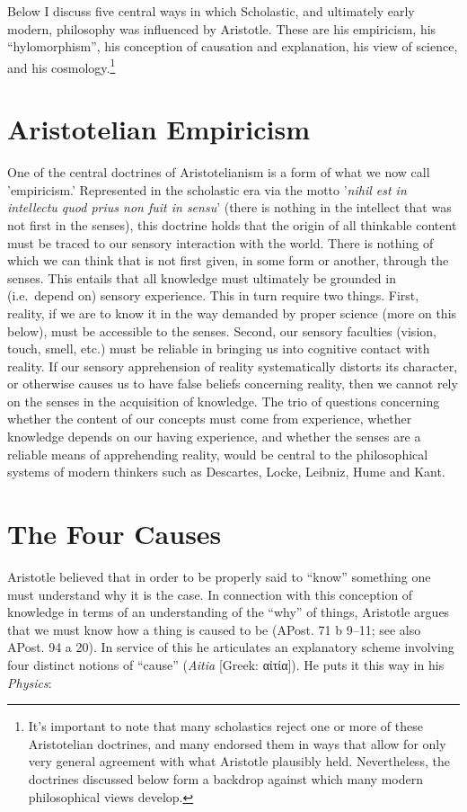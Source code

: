 \documentclass[12pt]{article}
\begin{document}
Below I discuss five central ways in which Scholastic, and ultimately early modern,
philosophy was influenced by Aristotle. These are his empiricism, his ``hylomorphism'',
his conception of causation and explanation, his view of science, and his
cosmology.\footnote{It's important to note that many scholastics reject one or more
of these Aristotelian doctrines, and many endorsed them in ways
that allow for only very general agreement with what Aristotle
plausibly held. Nevertheless, the doctrines discussed below form
a backdrop against which many modern philosophical views develop.}

\section{Aristotelian Empiricism}
\label{sec:org6a06f2b}
One of the central doctrines of Aristotelianism is a form of what we now call
'empiricism.' Represented in the scholastic era via the motto '\emph{nihil est in
intellectu quod prius non fuit in sensu}' (there is nothing in the intellect that was
not first in the senses), this doctrine holds that the origin of all thinkable
content must be traced to our sensory interaction with the world. There is nothing of
which we can think that is not first given, in some form or another, through the
senses. This entails that all knowledge must ultimately be grounded in (i.e. depend
on) sensory experience. This in turn require two things. First, reality, if we are to
know it in the way demanded by proper science (more on this below), must be
accessible to the senses. Second, our sensory faculties (vision, touch, smell, etc.)
must be reliable in bringing us into cognitive contact with reality. If our sensory
apprehension of reality systematically distorts its character, or otherwise causes us
to have false beliefs concerning reality, then we cannot rely on the senses in the
acquisition of knowledge. The trio of questions concerning whether the content of our
concepts must come from experience, whether knowledge depends on our having
experience, and whether the senses are a reliable means of apprehending reality,
would be central to the philosophical systems of modern thinkers such as Descartes,
Locke, Leibniz, Hume and Kant.

\section{The Four Causes}
\label{sec:orge4598d2}
Aristotle believed that in order to be properly said to ``know'' something one must
understand why it is the case. In connection with this conception of knowledge in
terms of an understanding of the ``why'' of things, Aristotle argues that we must know
how a thing is caused to be (APost. 71 b 9--11; see also APost. 94 a 20). In service
of this he articulates an explanatory scheme involving four distinct notions of
``cause'' (\emph{Aitia} [Greek: αἰτία]). He puts it this way in his \emph{Physics}:
\end{document}
